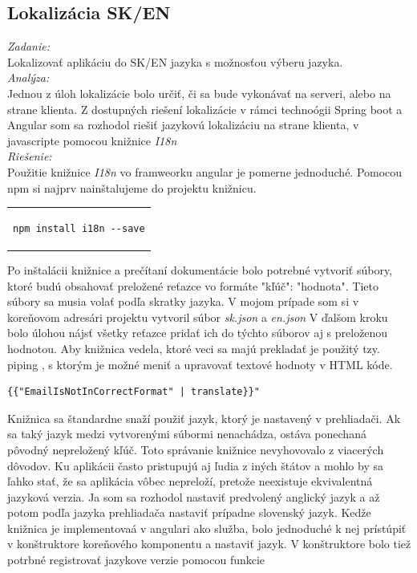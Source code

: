 \documentclass[11pt, oneside]{report}
\begin{document}
\subsection{Lokalizácia SK/EN}
\textit{Zadanie:}\\
Lokalizovať aplikáciu do SK/EN jazyka s možnosťou výberu jazyka.
\\\textit{Analýza:}\\
Jednou z  úloh  lokalizácie bolo určiť, či sa bude vykonávať na serveri, alebo na strane klienta. Z dostupných riešení lokalizácie v rámci technoógii Spring boot a Angular  som sa rozhodol riešiť jazykovú lokalizáciu na strane klienta, v javascripte pomocou knižnice \textit{I18n}\cite{i18n}
\\\textit{Riešenie:}\\
Použitie knižnice \textit{I18n} vo framweorku angular je pomerne jednoduché. Pomocou npm si najprv nainštalujeme do projektu knižnicu.
\begin{center}
\begin{tabular}{c}
\lstset{language=HTML5}
\begin{lstlisting}[showstringspaces=false]
npm install i18n --save
\end{lstlisting}
\end{tabular}
\end{center}
Po inštalácii knižnice a  prečítaní dokumentácie  bolo  potrebné vytvoriť súbory, ktoré budú obsahovať preložené reťazce vo formáte "kľúč": "hodnota". Tieto súbory sa  musia volať podľa skratky jazyka. V mojom prípade som si v koreňovom adresári projektu vytvoril súbor \textit{sk.json} a \textit{en.json} V ďalšom kroku  bolo úlohou nájsť všetky reťazce pridať ich do  týchto súborov  aj  s preloženou hodnotou. Aby knižnica vedela, ktoré  veci sa majú prekladať je  použitý tzy. piping , s ktorým je možné meniť a upravovať textové hodnoty v HTML kóde.
\lstset{language=HTML5}
\begin{lstlisting}[showstringspaces=false,caption= String interpolation s použitím popingu na preklad,captionpos=b]
		  {{"EmailIsNotInCorrectFormat" | translate}}"
\end{lstlisting}
Knižnica sa štandardne snaží použiť jazyk, ktorý je nastavený v prehliadači. Ak sa taký jazyk  medzi vytvorenými súbormi nenachádza, ostáva ponechaná pôvodný nepreložený kľúč. Toto správanie knižnice  nevyhovovalo z viacerých dôvodov. Ku aplikácii často pristupujú aj ľudia z iných štátov a mohlo by sa ľahko stať, že sa aplikácia vôbec nepreloží, pretože neexistuje ekvivalentná jazyková verzia. Ja som sa rozhodol  nastaviť predvolený anglický jazyk a až potom podľa jazyka prehliadača  nastaviť  prípadne slovenský jazyk. Kedže knižnica je implementovaá v angulari ako služba, bolo jednoduché k nej prístúpiť v konštruktore koreňového komponentu a nastaviť jazyk. V konštruktore bolo  tiež potrbné registrovať jazykove verzie pomocou funkcie\lstset{language=JavaScript}
\end{document}
